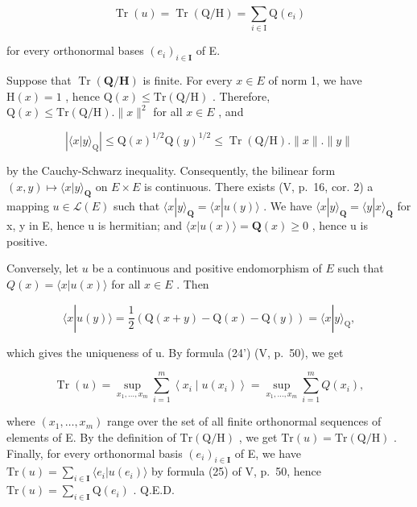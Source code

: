 \[
\operatorname{Tr} (u) = \operatorname{Tr} (\mathrm{Q} / \mathrm{H}) = \sum_ {i \in \mathrm{I}} \mathrm{Q} \left(e _ {i}\right)\tag{44}
\]

for every orthonormal bases \((e_i)_{i\in \mathbf{I}}\) of E.

Suppose that \(\operatorname{Tr}(\mathbf{Q} / \mathbf{H})\) is finite. For every \(x\in E\) of norm 1, we have \(\mathrm{H}(x) = 1\) , hence \(\mathrm{Q}(x)\leqslant \mathrm{Tr}(\mathrm{Q} / \mathrm{H})\) . Therefore, \(\mathrm{Q}(x)\leqslant \mathrm{Tr}(\mathrm{Q} / \mathrm{H}).\| x\|^2\) for all \(x\in E\) , and

\[
\left| \langle x | y \rangle_ {\mathrm{Q}} \right| \leqslant \mathrm{Q} (x) ^ {1 / 2} \mathrm{Q} (y) ^ {1 / 2} \leqslant \operatorname{Tr} (\mathrm{Q} / \mathrm{H}). \| x \|. \| y \|
\]

by the Cauchy-Schwarz inequality. Consequently, the bilinear form \((x,y)\mapsto\langle x|y\rangle_{\mathbf{Q}}\) on \(E\times E\) is continuous. There exists (V, p.~16, cor. 2) a mapping \(u\in\mathcal{L}(E)\) such that \(\langle x|y\rangle_{\mathbf{Q}}=\langle x|u(y)\rangle\) . We have \(\langle x|y\rangle_{\mathbf{Q}}=\langle y|x\rangle_{\mathbf{Q}}\) for x, y in E, hence u is hermitian; and \(\langle x|u(x)\rangle=\mathbf{Q}(x)\geqslant0\) , hence u is positive.

Conversely, let \(u\) be a continuous and positive endomorphism of \(E\) such that \(Q(x) = \langle x|u(x) \rangle\) for all \(x \in E\) . Then

\[
\langle x | u (y) \rangle = \frac {1}{2} (\mathrm{Q} (x + y) - \mathrm{Q} (x) - \mathrm{Q} (y)) = \langle x | y \rangle_ {\mathrm{Q}},
\]

which gives the uniqueness of u. By formula (24') (V, p.~50), we get

\[
\operatorname{Tr} (u) = \sup _ {x _ {1}, \dots , x _ {m}} \sum_ {i = 1} ^ {m} \left\langle x _ {i} \mid u \left(x _ {i}\right) \right\rangle = \sup _ {x _ {1}, \dots , x _ {m}} \sum_ {i = 1} ^ {m} Q \left(x _ {i}\right),
\]

where \((x_{1},\ldots ,x_{m})\) range over the set of all finite orthonormal sequences of elements of E. By the definition of \(\mathrm{Tr}(\mathrm{Q / H})\) , we get \(\mathrm{Tr}(u) = \mathrm{Tr}(\mathrm{Q / H})\) . Finally, for every orthonormal basis \((e_i)_{i\in \mathbf{I}}\) of E, we have \(\mathrm{Tr}(u) = \sum_{i\in \mathbf{I}}\langle e_i|u(e_i)\rangle\) by formula (25) of V, p.~50, hence \(\mathrm{Tr}(u) = \sum_{i\in \mathbf{I}}\mathrm{Q}(e_i)\) . Q.E.D.

